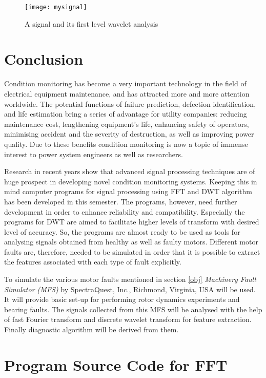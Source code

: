 \documentclass[a4paper,11pt]{article}
\begin{document}
\begin{figure}[h]
\centering
\texttt{[image: mysignal]}
\caption{A signal and its first level wavelet analysis} \label{figmsdwt}
\end{figure}

\section{Conclusion}
Condition monitoring has become a very important technology in the field of electrical equipment maintenance, and has attracted more and more attention worldwide. The potential functions of failure prediction, defection identification, and life estimation bring a series of advantage for utility companies: reducing maintenance cost, lengthening equipment's life, enhancing safety of operators, minimising accident and the severity of destruction, as well as improving power quality. Due to these benefits condition monitoring is now a topic of immense interest to power system engineers as well as researchers.

Research in recent years show that advanced signal processing techniques are of huge prospect in developing novel condition monitoring systems. Keeping this in mind computer programs for signal processing using FFT and DWT algorithm has been developed in this semester. The programs, however, need further development in order to enhance reliability and compatibility. Especially the programs for DWT are aimed to facilitate higher levels of transform with desired level of accuracy. So, the programs are almost ready to be used as tools for analysing signals obtained from healthy as well as faulty motors. Different motor faults are, therefore, needed to be simulated in order that it is possible to extract the features associated with each type of fault explicitly.

To simulate the various motor faults mentioned in section \ref{obj} \emph{Machinery Fault Simulator (MFS)} by SpectraQuest, Inc., Richmond, Virginia, USA will be used. It will provide basic set-up for performing rotor dynamics experiments and bearing faults. The signals collected from this MFS will be analysed with the help of fast Fourier transform and discrete wavelet transform for feature extraction. Finally diagnostic algorithm will be derived from them.
	 
\clearpage

\appendix
\section{Program Source Code for FFT} \label{pscfft}
\end{document}
